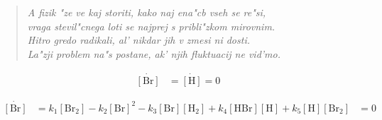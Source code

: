\documentclass[a4paper,10pt]{article}
\begin{document}
\begin{verse}
\textit{A fizik "ze ve kaj storiti, kako naj ena"cb vseh se re"si, \\
vraga stevil"cnega loti se najprej s pribli"zkom mirovnim. \\
Hitro gredo radikali, al' nikdar jih v zmesi ni dosti. \\
La"zji problem na"s postane, ak' njih fluktuacij ne vid'mo. 
}
\end{verse}

\begin{align}
 \dot{[\mathrm{Br}]} &= \dot{[\mathrm{H}]} = 0
\end{align}


\begin{align}
 \dot{[\mathrm{Br}]} &= k_1 [\mathrm{Br_2}] - k_2 [\mathrm{Br}]^2 - k_3 [\mathrm{Br}] [\mathrm{H_2}] + k_4 [\mathrm{HBr}] [\mathrm{H}] + k_5 [\mathrm{H}] [\mathrm{Br_2}] &= 0 
\end{align}
\end{document}
